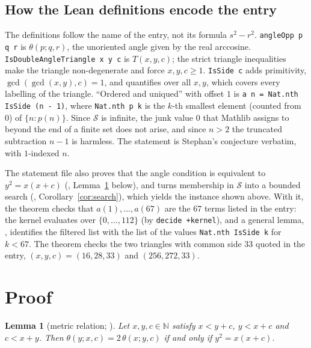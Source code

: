 \documentclass[11pt]{amsart}
\theoremstyle{plain}
\newtheorem{lemma}[theorem]{Lemma}
\theoremstyle{definition}
\newcommand{\code}[1]{\texttt{#1}}
\newcommand{\N}{\mathbb{N}}
\newcommand{\Side}{\mathcal{S}}
\newcommand{\ang}{\theta}
\begin{document}
\subsection*{How the Lean definitions encode the entry}
The definitions follow the name of the entry, not its formula $s^2-r^2$. \code{angleOpp p q r} is $\ang(p;q,r)$, the unoriented angle given by the real arccosine. \code{IsDoubleAngleTriangle x y c} is $T(x,y,c)$; the strict triangle inequalities make the triangle non-degenerate and force $x,y,c\ge1$. \code{IsSide c} adds primitivity, $\gcd(\gcd(x,y),c)=1$, and quantifies over all $x,y$, which covers every labelling of the triangle. ``Ordered and uniqued'' with offset $1$ is \code{a n = Nat.nth IsSide (n - 1)}, where \code{Nat.nth p k} is the $k$-th smallest element (counted from $0$) of $\{n : p(n)\}$. Since $\Side$ is infinite, the junk value $0$ that Mathlib assigns to  beyond the end of a finite set does not arise, and since $n>2$ the truncated subtraction $n-1$ is harmless. The statement is Stephan's conjecture verbatim, with $1$-indexed $n$.

The statement file also proves that the angle condition is equivalent to $y^2=x(x+c)$ (, Lemma~\ref{lem:metric} below), and turns membership in $\Side$ into a bounded search (, Corollary~\ref{cor:search}), which yields the  instance shown above. With it, the theorem  checks that $a(1),\dots,a(67)$ are the $67$ terms listed in the entry: the kernel evaluates  over $\{0,\dots,112\}$ (by \texttt{decide +kernel}), and a general lemma, , identifies the filtered list with the list of the values \code{Nat.nth IsSide k} for $k<67$. The theorem  checks the two triangles with common side $33$ quoted in the entry, $(x,y,c)=(16,28,33)$ and $(256,272,33)$.

\section{Proof}\label{sec:proof}

\begin{lemma}[metric relation; ]\label{lem:metric}
Let $x,y,c\in\N$ satisfy $x<y+c$, $y<x+c$ and $c<x+y$. Then $\ang(y;x,c)=2\,\ang(x;y,c)$ if and only if $y^2=x(x+c)$.
\end{lemma}
\end{document}
